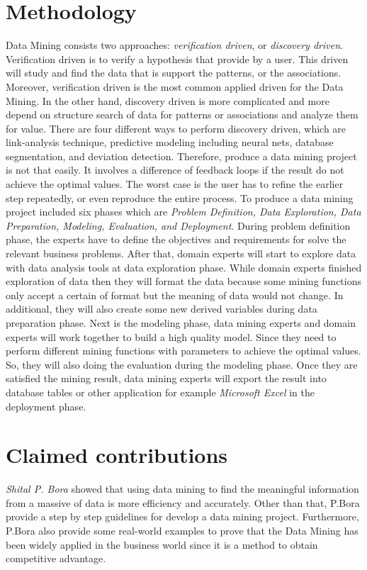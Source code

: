 \documentclass[a4paper,12pt]{article}
\begin{document}
\section{Methodology}
\hspace*{1cm}Data Mining consists two approaches: \textit{verification driven}, or \textit{discovery driven}. Verification driven is to verify a hypothesis that provide by a user. This driven will study and find the data that is support the patterns, or the associations. Moreover, verification driven is the most common applied driven for the Data Mining. In the other hand, discovery driven is more complicated and more depend on structure search of data for patterns or associations and analyze them for value. There are four different ways to perform discovery driven, which are link-analysis technique, predictive modeling including neural nets, database segmentation, and deviation detection. Therefore, produce a data mining project is not that easily. It involves a difference of feedback loops if the result do not achieve the optimal values. The worst case is the user has to refine the earlier step repeatedly, or even reproduce the entire process. To produce a data mining project included six phases which are \textit{Problem Definition, Data Exploration, Data Preparation, Modeling, Evaluation, and Deployment}. During problem definition phase, the experts have to define the objectives and requirements for solve the relevant business problems. After that, domain experts will start to explore data with data analysis tools at data exploration phase. While domain experts finished exploration of data then they will format the data because some mining functions only accept a certain of format but the meaning of data would not change. In additional, they will also create some new derived variables during data preparation phase. Next is the modeling phase, data mining experts and domain experts will work together to build a high quality model. Since they need to perform different mining functions with parameters to achieve the optimal values. So, they will also doing the evaluation during the modeling phase. Once they are satisfied the mining result, data mining experts will export the result into database tables or other application for example \textit{Microsoft Excel} in the deployment phase. 
\section{Claimed contributions}
\hspace*{1cm}\textit{Shital P. Bora} showed that using data mining to find the meaningful information from a massive of data is more efficiency and accurately. Other than that, P.Bora provide a step by step guidelines for develop a data mining project.  Furthermore, P.Bora also provide some real-world examples to prove that the Data Mining has been widely applied in the business world since it is a method to obtain competitive advantage.
\newpage
\end{document}
